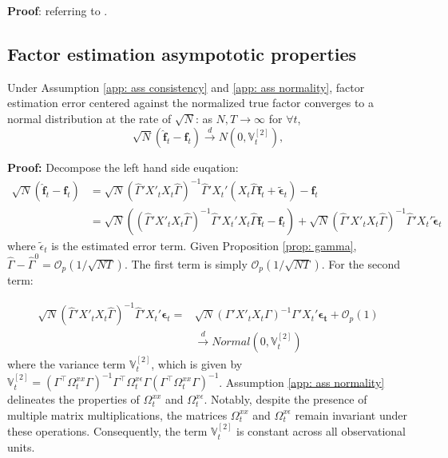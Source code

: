 \documentclass[12pt]{article}
\begin{document}
\textbf{Proof}: referring to \cite{kelly2020instrumented}.
\subsection{Factor estimation asympototic properties}
\begin{proposition}
Under Assumption \ref{app: ass consistency} and \ref{app: ass normality}, factor estimation error centered against the normalized true factor converges to a normal distribution at the rate of $\sqrt{N}$: as $N, T \to \infty$ for $\forall t$,
$$
\sqrt{N}\left(\hat{\mathbf{f}}_t - \mathbf{f}_t\right) \xrightarrow{d} N\left(0, \mathbb{V}_t^{[2]}\right),
$$
\end{proposition}

\textbf{Proof:} Decompose the left hand side euqation:
\begin{equation*}
\begin{aligned}
\sqrt{N}\left(\mathbf{\hat{f}}_t - \mathbf{f}_t\right) &= \sqrt{N}\left( \hat{\Gamma}'X'_tX_t\hat{\Gamma} \right)^{-1}\hat{\Gamma}'X_t' \left(X_t\hat{\Gamma}\mathbf{f}_t+ \mathbf{\tilde{\epsilon}}_t \right) - \mathbf{f}_t\\
&= \sqrt{N}\left(\left( \hat{\Gamma}'X'_tX_t\hat{\Gamma} \right)^{-1}\hat{\Gamma}'X_t'X_t \hat{\Gamma}\mathbf{f}_t - \mathbf{f}_t\right) + \sqrt{N}\left( \hat{\Gamma}'X'_tX_t\hat{\Gamma} \right)^{-1}\hat{\Gamma}'X_t'\mathbf{\tilde{\epsilon}}_t
\end{aligned}
\end{equation*}
where $\tilde{\epsilon}_t$ is the estimated error term. Given Proposition \ref{prop: gamma}, $\hat{\Gamma} - \hat{\Gamma}^0 = \mathcal{O}_p \left( 1/\sqrt{NT} \right)$. The first term is simply $\mathcal{O}_p\left(1/\sqrt{NT}\right)$. For the second term:

\begin{equation*}
\begin{aligned}
\sqrt{N}\left( \hat{\Gamma}'X'_tX_t\hat{\Gamma} \right)^{-1}\hat{\Gamma}'X_t'\mathbf{\epsilon}_t = &\sqrt{N}\left( \Gamma'X'_tX_t\Gamma \right)^{-1}\Gamma'X_t'\mathbf{\epsilon_t} + \mathcal{O}_p(1) \\
& \xrightarrow{d} Normal(0, \mathbb{V}_t^{[2]})
\end{aligned}
\end{equation*}
where the variance term \(\mathbb{V}_{t}^{[2]}\), which is given by \(\mathbb{V}_{t}^{[2]} = \left( \Gamma^\top \Omega_{t}^{xx} \Gamma\right)^{-1} \Gamma^\top \Omega_{t}^{x\epsilon} \Gamma \left(\Gamma^\top\Omega_{t}^{xx} \Gamma\right)^{-1}\). Assumption \ref{app: ass normality} delineates the properties of \(\Omega_t^{xx}\) and \(\Omega_t^{x\epsilon}\). Notably, despite the presence of multiple matrix multiplications, the matrices \(\Omega_t^{xx}\) and \(\Omega_t^{x\epsilon}\) remain invariant under these operations. Consequently, the term \(\mathbb{V}_t^{[2]}\) is constant across all observational units.
\end{document}
